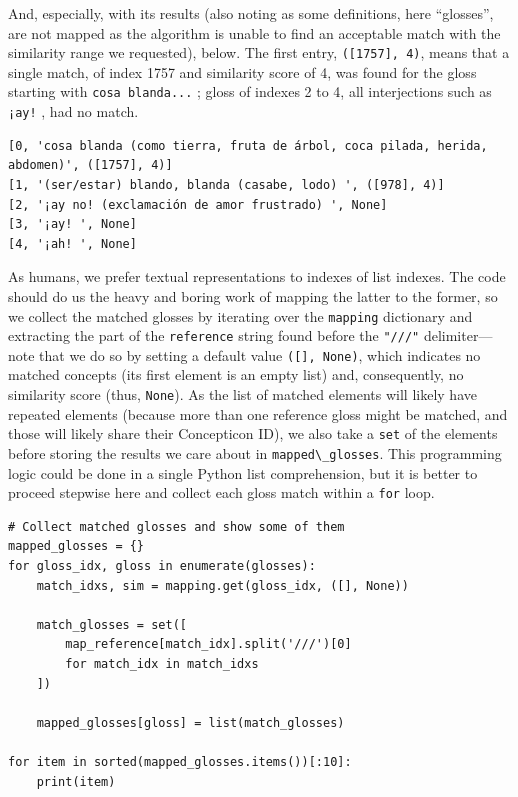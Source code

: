 \documentclass[
  a4paper,
  14pt,
  oneside,
  tablecaptionabove
]{scrbook}
\newcommand{\passthrough}[1]{#1}
\begin{document}
And, especially, with its results (also noting as some definitions, here
\enquote{glosses}, are not mapped as the algorithm is unable to find an
acceptable match with the similarity range we requested), below. The
first entry, \passthrough{\lstinline!([1757], 4)!}, means that a single
match, of index 1757 and similarity score of 4, was found for the gloss
starting with \passthrough{\lstinline!cosa blanda...!} ; gloss of
indexes 2 to 4, all interjections such as \passthrough{\lstinline"¡ay!"}
, had no match.

\begin{lstlisting}
[0, 'cosa blanda (como tierra, fruta de árbol, coca pilada, herida, abdomen)', ([1757], 4)]
[1, '(ser/estar) blando, blanda (casabe, lodo) ', ([978], 4)]
[2, '¡ay no! (exclamación de amor frustrado) ', None]
[3, '¡ay! ', None]
[4, '¡ah! ', None]
\end{lstlisting}

As humans, we prefer textual representations to indexes of list indexes.
The code should do us the heavy and boring work of mapping the latter to
the former, so we collect the matched glosses by iterating over the
\passthrough{\lstinline!mapping!} dictionary and extracting the part of
the \passthrough{\lstinline!reference!} string found before the
\passthrough{\lstinline!"///"!} delimiter--- note that we do so by
setting a default value \passthrough{\lstinline!([], None)!}, which
indicates no matched concepts (its first element is an empty list) and,
consequently, no similarity score (thus, \passthrough{\lstinline!None!}).
As the list of matched elements will likely have repeated elements
(because more than one reference gloss might be matched, and those will
likely share their Concepticon ID), we also take a
\passthrough{\lstinline!set!} of the elements before storing the results
we care about in \passthrough{\lstinline!mapped\_glosses!}. This
programming logic could be done in a single Python list comprehension,
but it is better to proceed stepwise here and collect each gloss match
within a \passthrough{\lstinline!for!} loop.

\begin{lstlisting}
# Collect matched glosses and show some of them
mapped_glosses = {}
for gloss_idx, gloss in enumerate(glosses):
    match_idxs, sim = mapping.get(gloss_idx, ([], None))

    match_glosses = set([
        map_reference[match_idx].split('///')[0]
        for match_idx in match_idxs
    ])

    mapped_glosses[gloss] = list(match_glosses)

for item in sorted(mapped_glosses.items())[:10]:
    print(item)
\end{lstlisting}
\end{document}
